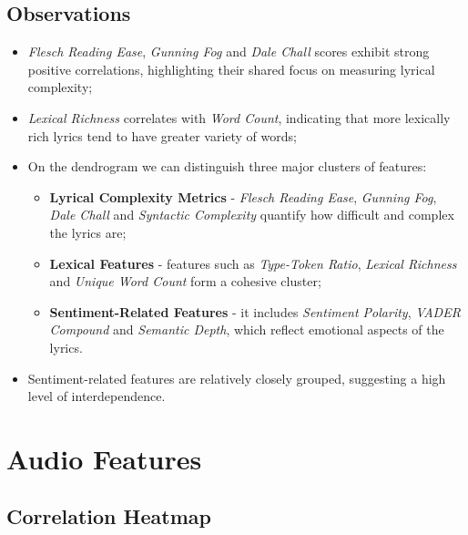 \subsection*{Observations}

\begin{itemize}
  \item \textit{Flesch Reading Ease}, \textit{Gunning Fog} and \textit{Dale
    Chall} scores exhibit strong positive correlations, highlighting their
    shared focus on measuring lyrical complexity;
  \item \textit{Lexical Richness} correlates with \textit{Word Count},
    indicating that more lexically rich lyrics tend to have  greater variety
    of words;
  \item On the dendrogram we can distinguish three major clusters of features:
    \begin{itemize}
      \item \textbf{Lyrical Complexity Metrics} - \textit{Flesch Reading Ease},
        \textit{Gunning Fog}, \textit{Dale Chall} and \textit{Syntactic
        Complexity } quantify how difficult and complex the lyrics are;
      \item  \textbf{Lexical Features} - features such as \textit{Type-Token
        Ratio}, \textit{Lexical Richness} and \textit{Unique Word Count} form a
        cohesive cluster;
      \item \textbf{Sentiment-Related Features} - it includes \textit{Sentiment
        Polarity}, \textit{VADER Compound} and \textit{Semantic Depth}, which
        reflect emotional aspects of the lyrics.
    \end{itemize}
  \item Sentiment-related features are relatively closely grouped, suggesting a
    high level of interdependence.
\end{itemize}


\section{Audio Features}

\subsection*{Correlation Heatmap}
\label{sec:correlationheatmapsspotifyfeatures}

